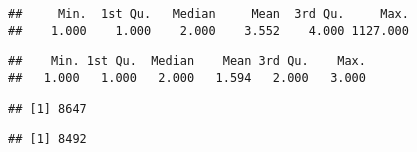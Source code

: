 \documentclass[
]{article}
\newenvironment{Shaded}{\begin{snugshade}}{\end{snugshade}}
\newcommand{\CommentTok}[1]{\textcolor[rgb]{0.56,0.35,0.01}{\textit{#1}}}
\newcommand{\KeywordTok}[1]{\textcolor[rgb]{0.13,0.29,0.53}{\textbf{#1}}}
\newcommand{\NormalTok}[1]{#1}
\newcommand{\OperatorTok}[1]{\textcolor[rgb]{0.81,0.36,0.00}{\textbf{#1}}}
\begin{document}
\begin{verbatim}
##     Min.  1st Qu.   Median     Mean  3rd Qu.     Max. 
##    1.000    1.000    2.000    3.552    4.000 1127.000
\end{verbatim}

\begin{Shaded}
\end{Shaded}

\begin{verbatim}
##    Min. 1st Qu.  Median    Mean 3rd Qu.    Max. 
##   1.000   1.000   2.000   1.594   2.000   3.000
\end{verbatim}

\begin{Shaded}
\end{Shaded}

\begin{Shaded}
\end{Shaded}

\begin{verbatim}
## [1] 8647
\end{verbatim}

\begin{Shaded}
\end{Shaded}

\begin{verbatim}
## [1] 8492
\end{verbatim}

\begin{Shaded}
\end{Shaded}
\end{document}
